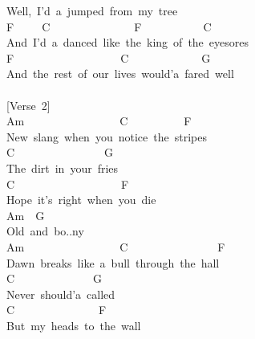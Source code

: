 \documentclass[]{book}
\begin{document}
Well,~I'd~a~jumped~from~my~tree\\
\hspace*{0.333em}\hspace*{0.333em}\hspace*{0.333em}\hspace*{0.333em}F~~~~~C~~~~~~~~~~~~~~~F~~~~~~~~~~~C\\
And~I'd~a~danced~like~the~king~of~the~eyesores\\
F~~~~~~~~~~~~~~~~~~~C~~~~~~~~~~~~~G\\
And~the~rest~of~our~lives~would'a~fared~well\\
~\\
{[}Verse~2{]}\\
Am~~~~~~~~~~~~~~~~~C~~~~~~~~~~F\\
New~slang~when~you~notice~the~stripes\\
C~~~~~~~~~~~~~~~~G\\
The~dirt~in~your~fries\\
\hspace*{0.333em}\hspace*{0.333em}\hspace*{0.333em}\hspace*{0.333em}\hspace*{0.333em}C~~~~~~~~~~~~~~~~~~~F\\
Hope~it's~right~when~you~die\\
\hspace*{0.333em}\hspace*{0.333em}\hspace*{0.333em}\hspace*{0.333em}\hspace*{0.333em}\hspace*{0.333em}\hspace*{0.333em}\hspace*{0.333em}Am~~G\\
Old~and~bo..ny\\
Am~~~~~~~~~~~~~~~~~C~~~~~~~~~~~~~~~~F\\
Dawn~breaks~like~a~bull~through~the~hall\\
C~~~~~~~~~~~~~~G\\
Never~should'a~called\\
\hspace*{0.333em}\hspace*{0.333em}\hspace*{0.333em}\hspace*{0.333em}C~~~~~~~~~~~~~~~F\\
But~my~heads~to~the~wall\\
\end{document}

